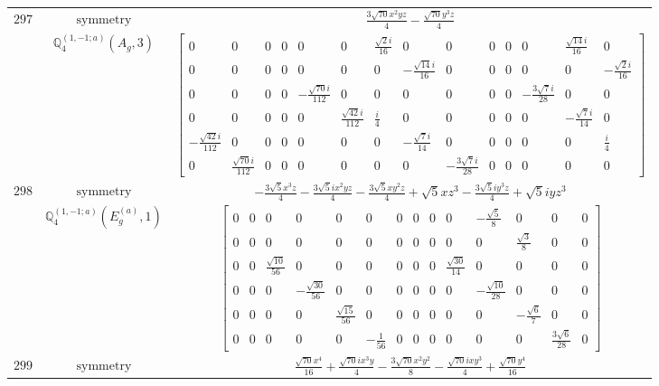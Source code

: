 \documentclass[fleqn,8pt,landscape]{jsarticle}
\begin{document}
\begin{longtable}{ccc}
$ 297 $ & $ \text{symmetry} $ & $ \frac{3 \sqrt{70} x^{2} y z}{4} - \frac{\sqrt{70} y^{3} z}{4} $ \\
$  $ & $ \mathbb{Q}_{4}^{(1,-1;a)}(A_{g},3) $ & $ \begin{bmatrix} 0 & 0 & 0 & 0 & 0 & 0 & \frac{\sqrt{2} i}{16} & 0 & 0 & 0 & 0 & 0 & \frac{\sqrt{14} i}{16} & 0 \\ 0 & 0 & 0 & 0 & 0 & 0 & 0 & - \frac{\sqrt{14} i}{16} & 0 & 0 & 0 & 0 & 0 & - \frac{\sqrt{2} i}{16} \\ 0 & 0 & 0 & 0 & - \frac{\sqrt{70} i}{112} & 0 & 0 & 0 & 0 & 0 & 0 & - \frac{3 \sqrt{7} i}{28} & 0 & 0 \\ 0 & 0 & 0 & 0 & 0 & \frac{\sqrt{42} i}{112} & \frac{i}{4} & 0 & 0 & 0 & 0 & 0 & - \frac{\sqrt{7} i}{14} & 0 \\ - \frac{\sqrt{42} i}{112} & 0 & 0 & 0 & 0 & 0 & 0 & - \frac{\sqrt{7} i}{14} & 0 & 0 & 0 & 0 & 0 & \frac{i}{4} \\ 0 & \frac{\sqrt{70} i}{112} & 0 & 0 & 0 & 0 & 0 & 0 & - \frac{3 \sqrt{7} i}{28} & 0 & 0 & 0 & 0 & 0 \end{bmatrix} $ \\ \hline
$ 298 $ & $ \text{symmetry} $ & $ - \frac{3 \sqrt{5} x^{3} z}{4} - \frac{3 \sqrt{5} i x^{2} y z}{4} - \frac{3 \sqrt{5} x y^{2} z}{4} + \sqrt{5} x z^{3} - \frac{3 \sqrt{5} i y^{3} z}{4} + \sqrt{5} i y z^{3} $ \\
$  $ & $ \mathbb{Q}_{4}^{(1,-1;a)}(E_{g}^{(a)},1) $ & $ \begin{bmatrix} 0 & 0 & 0 & 0 & 0 & 0 & 0 & 0 & 0 & 0 & - \frac{\sqrt{5}}{8} & 0 & 0 & 0 \\ 0 & 0 & 0 & 0 & 0 & 0 & 0 & 0 & 0 & 0 & 0 & \frac{\sqrt{3}}{8} & 0 & 0 \\ 0 & 0 & \frac{\sqrt{10}}{56} & 0 & 0 & 0 & 0 & 0 & 0 & \frac{\sqrt{30}}{14} & 0 & 0 & 0 & 0 \\ 0 & 0 & 0 & - \frac{\sqrt{30}}{56} & 0 & 0 & 0 & 0 & 0 & 0 & - \frac{\sqrt{10}}{28} & 0 & 0 & 0 \\ 0 & 0 & 0 & 0 & \frac{\sqrt{15}}{56} & 0 & 0 & 0 & 0 & 0 & 0 & - \frac{\sqrt{6}}{7} & 0 & 0 \\ 0 & 0 & 0 & 0 & 0 & - \frac{1}{56} & 0 & 0 & 0 & 0 & 0 & 0 & \frac{3 \sqrt{6}}{28} & 0 \end{bmatrix} $ \\ \hline
$ 299 $ & $ \text{symmetry} $ & $ \frac{\sqrt{70} x^{4}}{16} + \frac{\sqrt{70} i x^{3} y}{4} - \frac{3 \sqrt{70} x^{2} y^{2}}{8} - \frac{\sqrt{70} i x y^{3}}{4} + \frac{\sqrt{70} y^{4}}{16} $ \\

\end{longtable}
\end{document}
